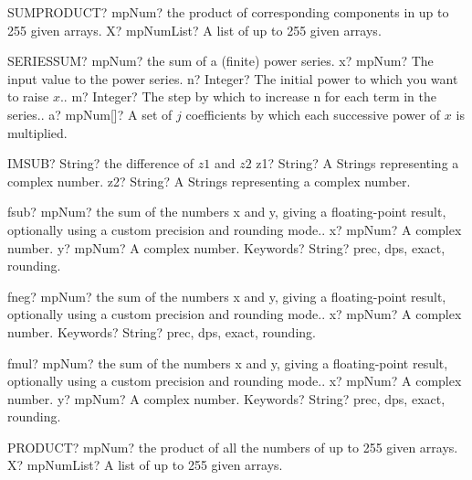 \documentclass[12pt,a4paper,openany]{book}
\begin{document}
\begin{mpFunctionsExtract}
\mpWorksheetFunctionOneNotImplemented
{SUMPRODUCT? mpNum? the product of corresponding components in up to 255 given arrays.}
{X? mpNumList? A list of up to 255 given arrays.}
\end{mpFunctionsExtract}

\begin{mpFunctionsExtract}
\mpWorksheetFunctionFour
{SERIESSUM? mpNum? the sum of a (finite) power series.}
{x? mpNum? The input value to the power series.}
{n? Integer? The initial power to which you want to raise $x$..}
{m? Integer? The step by which to increase n for each term in the series..}
{a? mpNum[]? A set of $j$ coefficients by which each successive power of $x$ is multiplied.}
\end{mpFunctionsExtract}

\begin{mpFunctionsExtract}
\mpWorksheetFunctionTwoNotImplemented
{IMSUB? String? the difference of $z1$ and $z2$}
{z1? String? A Strings representing a complex number.}
{z2? String? A Strings representing a complex number.}
\end{mpFunctionsExtract}

\begin{mpFunctionsExtract}
\mpFunctionThree
{fsub? mpNum? the sum of the numbers x and y, giving a floating-point result, optionally using a custom precision and rounding mode..}
{x? mpNum? A complex number.}
{y? mpNum? A complex number.}
{Keywords? String? prec, dps, exact, rounding.}
\end{mpFunctionsExtract}

\begin{mpFunctionsExtract}
\mpFunctionTwo
{fneg? mpNum? the sum of the numbers x and y, giving a floating-point result, optionally using a custom precision and rounding mode..}
{x? mpNum? A complex number.}
{Keywords? String? prec, dps, exact, rounding.}
\end{mpFunctionsExtract}

\begin{mpFunctionsExtract}
\mpFunctionThree
{fmul? mpNum? the sum of the numbers x and y, giving a floating-point result, optionally using a custom precision and rounding mode..}
{x? mpNum? A complex number.}
{y? mpNum? A complex number.}
{Keywords? String? prec, dps, exact, rounding.}
\end{mpFunctionsExtract}

\begin{mpFunctionsExtract}
\mpWorksheetFunctionOneNotImplemented
{PRODUCT? mpNum? the product of all the numbers of up to 255 given arrays.}
{X? mpNumList? A list of up to 255 given arrays.}
\end{mpFunctionsExtract}
\end{document}
